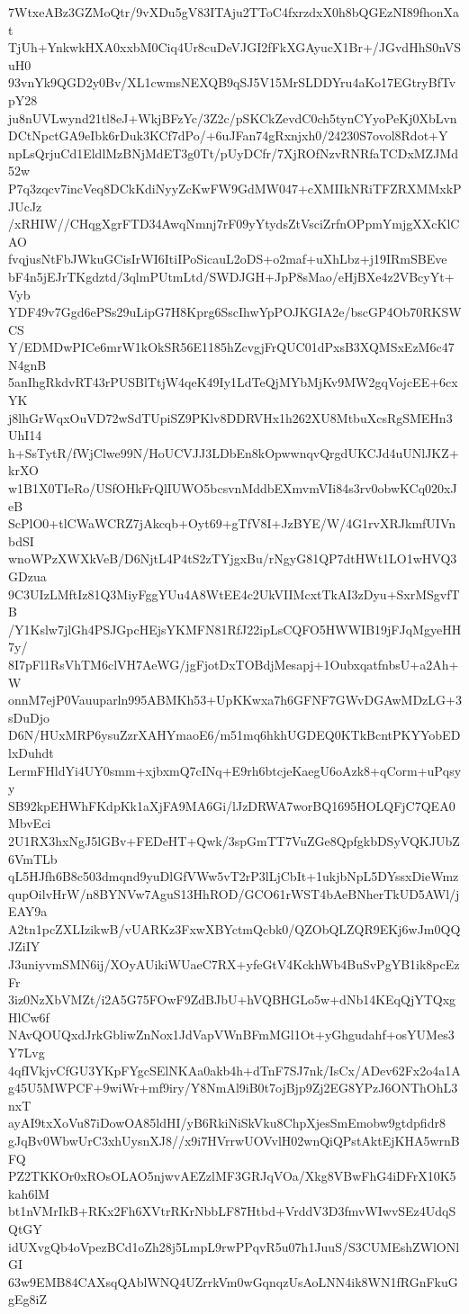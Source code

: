 7WtxeABz3GZMoQtr/9vXDu5gV83ITAju2TToC4fxrzdxX0h8bQGEzNI89fhonXat
TjUh+YnkwkHXA0xxbM0Ciq4Ur8cuDeVJGI2fFkXGAyucX1Br+/JGvdHhS0nVSuH0
93vnYk9QGD2y0Bv/XL1cwmsNEXQB9qSJ5V15MrSLDDYru4aKo17EGtryBfTvpY28
ju8nUVLwynd21tl8eJ+WkjBFzYc/3Z2c/pSKCkZevdC0ch5tynCYyoPeKj0XbLvn
DCtNpctGA9eIbk6rDuk3KCf7dPo/+6uJFan74gRxnjxh0/24230S7ovol8Rdot+Y
npLsQrjuCd1EldlMzBNjMdET3g0Tt/pUyDCfr/7XjROfNzvRNRfaTCDxMZJMd52w
P7q3zqcv7incVeq8DCkKdiNyyZcKwFW9GdMW047+cXMIIkNRiTFZRXMMxkPJUcJz
/xRHIW//CHqgXgrFTD34AwqNmnj7rF09yYtydsZtVsciZrfnOPpmYmjgXXcKlCAO
fvqjusNtFbJWkuGCisIrWI6ItiIPoSicauL2oDS+o2maf+uXhLbz+j19IRmSBEve
bF4n5jEJrTKgdztd/3qlmPUtmLtd/SWDJGH+JpP8sMao/eHjBXe4z2VBcyYt+Vyb
YDF49v7Ggd6ePSs29uLipG7H8Kprg6SscIhwYpPOJKGIA2e/bscGP4Ob70RKSWCS
Y/EDMDwPICe6mrW1kOkSR56E1185hZcvgjFrQUC01dPxsB3XQMSxEzM6c47N4gnB
5anIhgRkdvRT43rPUSBlTtjW4qeK49Iy1LdTeQjMYbMjKv9MW2gqVojcEE+6cxYK
j8lhGrWqxOuVD72wSdTUpiSZ9PKlv8DDRVHx1h262XU8MtbuXcsRgSMEHn3UhI14
h+SsTytR/fWjClwe99N/HoUCVJJ3LDbEn8kOpwwnqvQrgdUKCJd4uUNlJKZ+krXO
w1B1X0TIeRo/USfOHkFrQlIUWO5bcsvnMddbEXmvmVIi84s3rv0obwKCq020xJeB
ScPlO0+tlCWaWCRZ7jAkcqb+Oyt69+gTfV8I+JzBYE/W/4G1rvXRJkmfUIVnbdSI
wnoWPzXWXkVeB/D6NjtL4P4tS2zTYjgxBu/rNgyG81QP7dtHWt1LO1wHVQ3GDzua
9C3UIzLMftIz81Q3MiyFggYUu4A8WtEE4c2UkVIIMcxtTkAI3zDyu+SxrMSgvfTB
/Y1Kslw7jlGh4PSJGpcHEjsYKMFN81RfJ22ipLsCQFO5HWWIB19jFJqMgyeHH7y/
8I7pFl1RsVhTM6clVH7AeWG/jgFjotDxTOBdjMesapj+1OubxqatfnbsU+a2Ah+W
onnM7ejP0Vauuparln995ABMKh53+UpKKwxa7h6GFNF7GWvDGAwMDzLG+3sDuDjo
D6N/HUxMRP6ysuZzrXAHYmaoE6/m51mq6hkhUGDEQ0KTkBcntPKYYobEDlxDuhdt
LermFHldYi4UY0smm+xjbxmQ7cINq+E9rh6btcjeKaegU6oAzk8+qCorm+uPqsyy
SB92kpEHWhFKdpKk1aXjFA9MA6Gi/lJzDRWA7worBQ1695HOLQFjC7QEA0MbvEci
2U1RX3hxNgJ5lGBv+FEDeHT+Qwk/3spGmTT7VuZGe8QpfgkbDSyVQKJUbZ6VmTLb
qL5HJfh6B8c503dmqnd9yuDlGfVWw5vT2rP3lLjCbIt+1ukjbNpL5DYssxDieWmz
qupOilvHrW/n8BYNVw7AguS13HhROD/GCO61rWST4bAeBNherTkUD5AWl/jEAY9a
A2tn1pcZXLIzikwB/vUARKz3FxwXBYctmQcbk0/QZObQLZQR9EKj6wJm0QQJZiIY
J3uniyvmSMN6ij/XOyAUikiWUaeC7RX+yfeGtV4KckhWb4BuSvPgYB1ik8pcEzFr
3iz0NzXbVMZt/i2A5G75FOwF9ZdBJbU+hVQBHGLo5w+dNb14KEqQjYTQxgHlCw6f
NAvQOUQxdJrkGbliwZnNox1JdVapVWnBFmMGl1Ot+yGhgudahf+osYUMes3Y7Lvg
4qfIVkjvCfGU3YKpFYgcSElNKAa0akb4h+dTnF7SJ7nk/IsCx/ADev62Fx2o4a1A
g45U5MWPCF+9wiWr+mf9iry/Y8NmAl9iB0t7ojBjp9Zj2EG8YPzJ6ONThOhL3nxT
ayAI9txXoVu87iDowOA85ldHI/yB6RkiNiSkVku8ChpXjesSmEmobw9gtdpfidr8
gJqBv0WbwUrC3xhUysnXJ8//x9i7HVrrwUOVvlH02wnQiQPstAktEjKHA5wrnBFQ
PZ2TKKOr0xROsOLAO5njwvAEZzlMF3GRJqVOa/Xkg8VBwFhG4iDFrX10K5kah6lM
bt1nVMrIkB+RKx2Fh6XVtrRKrNbbLF87Htbd+VrddV3D3fmvWIwvSEz4UdqSQtGY
idUXvgQb4oVpezBCd1oZh28j5LmpL9rwPPqvR5u07h1JuuS/S3CUMEshZWlONlGI
63w9EMB84CAXsqQAblWNQ4UZrrkVm0wGqnqzUsAoLNN4ik8WN1fRGnFkuGgEg8iZ
